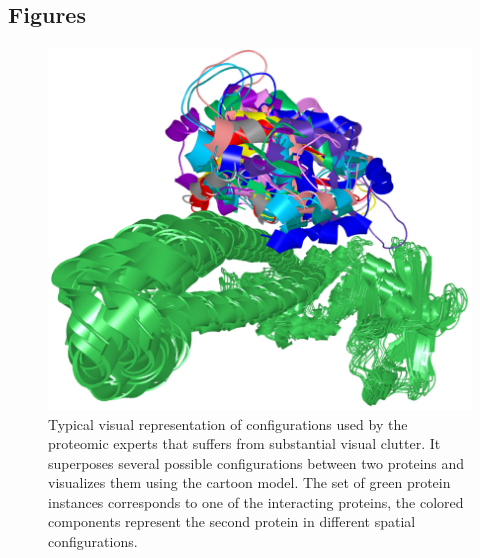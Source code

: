 \documentclass{bmcart}
\begin{document}
\begin{backmatter}




\section*{Figures}
  \begin{figure}[h!]
  \centering
  \includegraphics[width=0.9\columnwidth]{images/figure1.png}
 \caption{
	Typical visual representation of configurations used by the proteomic experts that suffers from substantial visual clutter. It superposes several possible configurations between two proteins and visualizes them using the cartoon model. The set of green protein instances corresponds to one of the interacting proteins, the colored components represent the second protein in different spatial configurations.}
  \label{fig:problem}
\end{figure}


\end{backmatter}
\end{document}
